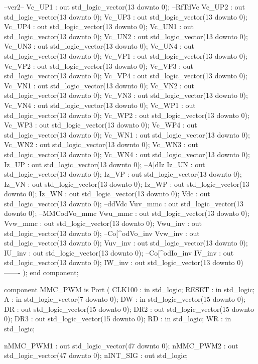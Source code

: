\begin{mylisting}[language=VHDL,caption=トップモジュール,label=appF_Top_module_VHDL]
			--ver2--
			Vc_UP1		: out	std_logic_vector(13 downto 0);		--RfTdVc
			Vc_UP2		: out	std_logic_vector(13 downto 0);
			Vc_UP3		: out	std_logic_vector(13 downto 0);
			Vc_UP4		: out	std_logic_vector(13 downto 0);
			Vc_UN1		: out	std_logic_vector(13 downto 0);
			Vc_UN2		: out	std_logic_vector(13 downto 0);
			Vc_UN3		: out	std_logic_vector(13 downto 0);
			Vc_UN4		: out	std_logic_vector(13 downto 0);
			Vc_VP1		: out	std_logic_vector(13 downto 0);
			Vc_VP2		: out	std_logic_vector(13 downto 0);
			Vc_VP3		: out	std_logic_vector(13 downto 0);
			Vc_VP4		: out	std_logic_vector(13 downto 0);
			Vc_VN1		: out	std_logic_vector(13 downto 0);
			Vc_VN2		: out	std_logic_vector(13 downto 0);
			Vc_VN3		: out	std_logic_vector(13 downto 0);
			Vc_VN4		: out	std_logic_vector(13 downto 0);
			Vc_WP1		: out	std_logic_vector(13 downto 0);
			Vc_WP2		: out	std_logic_vector(13 downto 0);
			Vc_WP3		: out	std_logic_vector(13 downto 0);
			Vc_WP4		: out	std_logic_vector(13 downto 0);
			Vc_WN1		: out	std_logic_vector(13 downto 0);
			Vc_WN2		: out	std_logic_vector(13 downto 0);
			Vc_WN3		: out	std_logic_vector(13 downto 0);
			Vc_WN4		: out	std_logic_vector(13 downto 0);
			Iz_UP			: out	std_logic_vector(13 downto 0);		--A[dIz
			Iz_UN			: out	std_logic_vector(13 downto 0);
			Iz_VP			: out	std_logic_vector(13 downto 0);
			Iz_VN			: out	std_logic_vector(13 downto 0);
			Iz_WP			: out	std_logic_vector(13 downto 0);
			Iz_WN			: out	std_logic_vector(13 downto 0);
			Vdc			: out	std_logic_vector(13 downto 0);		--ddVdc
			Vuv_mmc		: out	std_logic_vector(13 downto 0);		--MMCodVo_mmc
			Vwu_mmc		: out	std_logic_vector(13 downto 0);
			Vvw_mmc		: out	std_logic_vector(13 downto 0);
			Vwu_inv		: out	std_logic_vector(13 downto 0);		--Co[^odVo_inv
			Vvw_inv		: out	std_logic_vector(13 downto 0);
			Vuv_inv		: out	std_logic_vector(13 downto 0);
			IU_inv		: out	std_logic_vector(13 downto 0);		--Co[^odIo_inv
			IV_inv		: out	std_logic_vector(13 downto 0);
			IW_inv		: out	std_logic_vector(13 downto 0)		
			-------			
			);
	end component;


	component MMC_PWM is
		Port (
			CLK100		: in	std_logic;
			RESET		: in	std_logic;
			A			: in	std_logic_vector(7 downto 0);
			DW			: in	std_logic_vector(15 downto 0);
			DR			: out	std_logic_vector(15 downto 0);
			DR2			: out	std_logic_vector(15 downto 0);
			DR3			: out	std_logic_vector(15 downto 0);
			RD			: in	std_logic;
			WR			: in	std_logic;
			
			nMMC_PWM1	: out	std_logic_vector(47 downto 0);
			nMMC_PWM2	: out	std_logic_vector(47 downto 0);
			nINT_SIG	: out	std_logic;
			

\end{mylisting}
